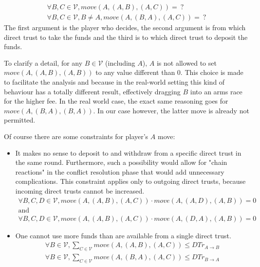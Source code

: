   \begin{gather*}
    \forall B, C \in \mathcal{V}, move\left(A, \left(A, B\right), \left(A, C\right) \right) = \: ? \\
    \forall B, C \in \mathcal{V}, B \neq A, move\left(A, \left(B, A\right), \left(A, C\right) \right) = \: ?
  \end{gather*}
  The first argument is the player who decides, the second argument is from which direct trust to take the funds and the third
  is to which direct trust to deposit the funds.
  
  To clarify a detail, for any $B \in \mathcal{V}$ (including $A$), $A$ is not allowed to set $move\left(A, \left(A, B\right),
  \left(A, B\right) \right)$ to any value different than 0. This choice is made to facilitate the analysis and because in the
  real-world setting this kind of behaviour has a totally different result, effectively dragging $B$ into an arms race for the
  higher fee. In the real world case, the exact same reasoning goes for $move\left(A, \left(B, A\right), \left(B, A\right)
  \right)$. In our case however, the latter move is already not permitted.
  
  Of course there are some constraints for player's $A$ move:
  
  \begin{itemize}
    \item It makes no sense to deposit to and withdraw from a specific direct trust in the same round. Furthermore, such a
    possibility would allow for "chain reactions" in the conflict resolution phase that would add unnecessary complications.
    This constraint applies only to outgoing direct trusts, because incoming direct trusts cannot be increased.
    \begin{gather*}
      \forall B, C, D \in \mathcal{V}, move\left(A, \left(A, B\right), \left(A, C\right) \right) \cdot move\left(A, \left(A,
      D\right), \left(A, B\right) \right) = 0 \\
      \mbox{and} \\
      \forall B, C, D \in \mathcal{V}, move\left(A, \left(A, B\right), \left(A, C\right) \right) \cdot move\left(A, \left(D,
      A\right), \left(A, B\right) \right) = 0
    \end{gather*}
  
    \item One cannot use more funds than are available from a single direct trust.
    \begin{gather*}
      \forall B \in \mathcal{V}, \sum\limits_{C \in \mathcal{V}} move\left(A, \left(A, B\right), \left(A, C\right) \right)
        \leq DTr_{A \rightarrow B} \\
      \forall B \in \mathcal{V}, \sum\limits_{C \in \mathcal{V}} move\left(A, \left(B, A\right), \left(A, C\right) \right)
        \leq DTr_{B \rightarrow A} \\
    \end{gather*}
  \end{itemize}
  
